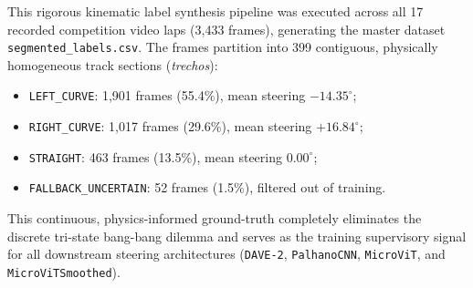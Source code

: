 \documentclass[10pt,journal,compsoc]{IEEEtran}
\begin{document}
\begin{table}[h]
\caption{Mathematical Acceptability Bounds and Quality Criteria}
\label{tab:bounds}
\centering
{}
\end{table}

This rigorous kinematic label synthesis pipeline was executed across all 17 recorded competition video laps (3,433 frames), generating the master dataset \texttt{segmented\_labels.csv}. The frames partition into 399 contiguous, physically homogeneous track sections (\textit{trechos}):
\begin{itemize}
    \item \texttt{LEFT\_CURVE}: 1,901 frames (55.4\%), mean steering $-14.35^\circ$;
    \item \texttt{RIGHT\_CURVE}: 1,017 frames (29.6\%), mean steering $+16.84^\circ$;
    \item \texttt{STRAIGHT}: 463 frames (13.5\%), mean steering $0.00^\circ$;
    \item \texttt{FALLBACK\_UNCERTAIN}: 52 frames (1.5\%), filtered out of training.
\end{itemize}
This continuous, physics-informed ground-truth completely eliminates the discrete tri-state bang-bang dilemma and serves as the training supervisory signal for all downstream steering architectures (\texttt{DAVE-2}, \texttt{PalhanoCNN}, \texttt{MicroViT}, and \texttt{MicroViTSmoothed}).
\end{document}

